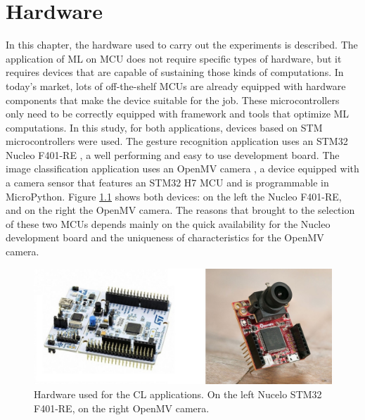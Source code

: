 \documentclass[12pt]{report}
\begin{document}
\chapter{Hardware} 
\label{hardware}
In this chapter, the hardware used to carry out the experiments is described. The application of ML on MCU does not require specific types of hardware, but it requires devices that are capable of sustaining those kinds of computations. In today's market, lots of off-the-shelf MCUs are already equipped with hardware components that make the device suitable for the job. These microcontrollers only need to be correctly equipped with framework and tools that optimize ML computations. In this study, for both applications, devices based on STM microcontrollers were used. The gesture recognition application uses an STM32 Nucleo F401-RE \cite{nucleo_datasheet}, a well performing and easy to use development board. The image classification application uses an OpenMV camera \cite{openmv_datasheet}, a device equipped with a camera sensor that features an STM32 H7 MCU and is programmable in MicroPython. Figure \ref{fig:hardware_all} shows both devices: on the left the Nucleo F401-RE, and on the right the OpenMV camera. The reasons that brought to the selection of these two MCUs depends mainly on the quick availability for the Nucleo development board and the uniqueness of characteristics for the OpenMV camera.

\begin{figure}[h!]
    \centering
    \includegraphics[width=120mm]{Figures/Chapter2/hardware.jpg} 
    \caption{Hardware used for the CL applications. On the left Nucelo STM32 F401-RE, on the right OpenMV camera.}
    \label{fig:hardware_all}    
\end{figure}
\end{document}
